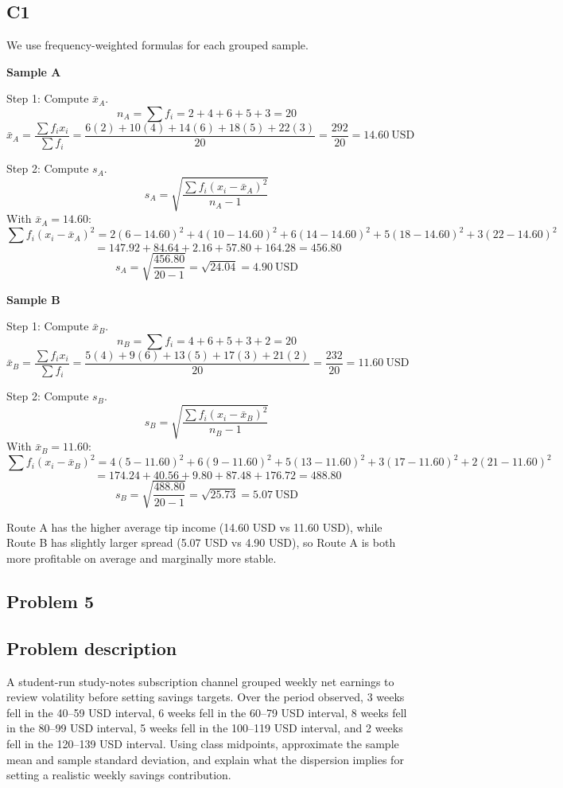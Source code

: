\begin{ExamProblems}
		\subsection*{C1}
		We use frequency-weighted formulas for each grouped sample.

		\textbf{Sample A}

		Step 1: Compute $\bar{x}_A$.
		\[
		n_A = \sum f_i = 2+4+6+5+3 = 20
		\]
		\[
		\bar{x}_A = \frac{\sum f_i x_i}{\sum f_i}
		= \frac{6(2)+10(4)+14(6)+18(5)+22(3)}{20}
		= \frac{292}{20}
		= 14.60\ \text{USD}
		\]

		Step 2: Compute $s_A$.
		\[
		s_A = \sqrt{\frac{\sum f_i(x_i-\bar{x}_A)^2}{n_A-1}}
		\]
		With $\bar{x}_A=14.60$:
		\[
		\sum f_i(x_i-\bar{x}_A)^2 = 2(6-14.60)^2 + 4(10-14.60)^2 + 6(14-14.60)^2 + 5(18-14.60)^2 + 3(22-14.60)^2
		\]
		\[
		\qquad = 147.92 + 84.64 + 2.16 + 57.80 + 164.28 = 456.80
		\]
		\[
		s_A = \sqrt{\frac{456.80}{20-1}} = \sqrt{24.04} = 4.90\ \text{USD}
		\]

		\textbf{Sample B}

		Step 1: Compute $\bar{x}_B$.
		\[
		n_B = \sum f_i = 4+6+5+3+2 = 20
		\]
		\[
		\bar{x}_B = \frac{\sum f_i x_i}{\sum f_i}
		= \frac{5(4)+9(6)+13(5)+17(3)+21(2)}{20}
		= \frac{232}{20}
		= 11.60\ \text{USD}
		\]

		Step 2: Compute $s_B$.
		\[
		s_B = \sqrt{\frac{\sum f_i(x_i-\bar{x}_B)^2}{n_B-1}}
		\]
		With $\bar{x}_B=11.60$:
		\[
		\sum f_i(x_i-\bar{x}_B)^2 = 4(5-11.60)^2 + 6(9-11.60)^2 + 5(13-11.60)^2 + 3(17-11.60)^2 + 2(21-11.60)^2
		\]
		\[
		\qquad = 174.24 + 40.56 + 9.80 + 87.48 + 176.72 = 488.80
		\]
		\[
		s_B = \sqrt{\frac{488.80}{20-1}} = \sqrt{25.73} = 5.07\ \text{USD}
		\]

		Route A has the higher average tip income (14.60 USD vs 11.60 USD), while Route B has slightly larger spread (5.07 USD vs 4.90 USD), so Route A is both more profitable on average and marginally more stable.

		\newpage
		\item
		\subsection*{Problem 5}
		\subsection*{Problem description}
		A student-run study-notes subscription channel grouped weekly net earnings to review volatility before setting savings targets. Over the period observed, 3 weeks fell in the 40--59 USD interval, 6 weeks fell in the 60--79 USD interval, 8 weeks fell in the 80--99 USD interval, 5 weeks fell in the 100--119 USD interval, and 2 weeks fell in the 120--139 USD interval. Using class midpoints, approximate the sample mean and sample standard deviation, and explain what the dispersion implies for setting a realistic weekly savings contribution.


\end{ExamProblems}
